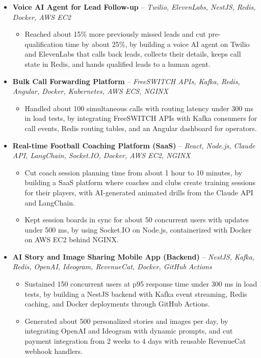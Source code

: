 \documentclass[11pt,a4paper,sans]{moderncv}
\begin{document}
\begin{itemize}
\item \textbf{Voice AI Agent for Lead Follow-up} -- \textit{Twilio, ElevenLabs, NestJS, Redis, Docker, AWS EC2}
\begin{itemize}
    \item Reached about 15\% more previously missed leads and cut pre-qualification time by about 25\%, by building a voice AI agent on Twilio and ElevenLabs that calls back leads, collects their details, keeps call state in Redis, and hands qualified leads to a human agent.
\end{itemize}

\item \textbf{Bulk Call Forwarding Platform} -- \textit{FreeSWITCH APIs, Kafka, Redis, Angular, Docker, Kubernetes, AWS ECS, NGINX}
\begin{itemize}
    \item Handled about 100 simultaneous calls with routing latency under 300 ms in load tests, by integrating FreeSWITCH APIs with Kafka consumers for call events, Redis routing tables, and an Angular dashboard for operators.
\end{itemize}

\item \textbf{Real-time Football Coaching Platform (SaaS)} -- \textit{React, Node.js, Claude API, LangChain, Socket.IO, Docker, AWS EC2, NGINX}
\begin{itemize}
    \item Cut coach session planning time from about 1 hour to 10 minutes, by building a SaaS platform where coaches and clubs create training sessions for their players, with AI-generated animated drills from the Claude API and LangChain.
    \item Kept session boards in sync for about 50 concurrent users with updates under 500 ms, by using Socket.IO on Node.js, containerized with Docker on AWS EC2 behind NGINX.
\end{itemize}

\item \textbf{AI Story and Image Sharing Mobile App (Backend)} -- \textit{NestJS, Kafka, Redis, OpenAI, Ideogram, RevenueCat, Docker, GitHub Actions}
\begin{itemize}
    \item Sustained 150 concurrent users at p95 response time under 300 ms in load tests, by building a NestJS backend with Kafka event streaming, Redis caching, and Docker deployments through GitHub Actions.
    \item Generated about 500 personalized stories and images per day, by integrating OpenAI and Ideogram with dynamic prompts, and cut payment integration from 2 weeks to 4 days with reusable RevenueCat webhook handlers.
\end{itemize}

\end{itemize}
\end{document}
